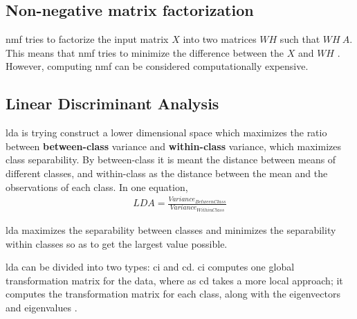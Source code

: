 
\subsection{Non-negative matrix factorization }\label{subsec:non-negative-matrix-factorization}
\gls{nmf} tries to factorize the input matrix $X$ into two matrices $WH$ such that $WH ~ A$. This means that \gls{nmf} tries to minimize the difference between the $X$ and $WH$ \cite{non-negative-matrix-factorization}. However, computing \gls{nmf} can be considered computationally expensive.

  


\subsection{Linear Discriminant Analysis}\label{subsec:linear-discriminant-analysis}
\gls{lda} is trying construct a lower dimensional space which maximizes the ratio between \textbf{between-class} variance and \textbf{within-class} variance, which maximizes class separability. By between-class it is meant the distance between means of different classes, and within-class as the distance between the mean and the observations of each class. In one equation, 
\begin{align}
  LDA = \frac{Variance_{BetweenClass}}{Variance_{WithinClass}}
\end{align}

\gls{lda} maximizes the separability between classes and minimizes the separability within classes so as to get the largest value possible.


    
\gls{lda} can be divided into two types: \gls{ci} and \gls{cd}. \gls{ci} computes one global transformation matrix for the data, where as \gls{cd} takes a more local approach; it computes the transformation matrix for each class, along with the eigenvectors and eigenvalues \cite{linear-discriminant-analysis-tutorial}.


